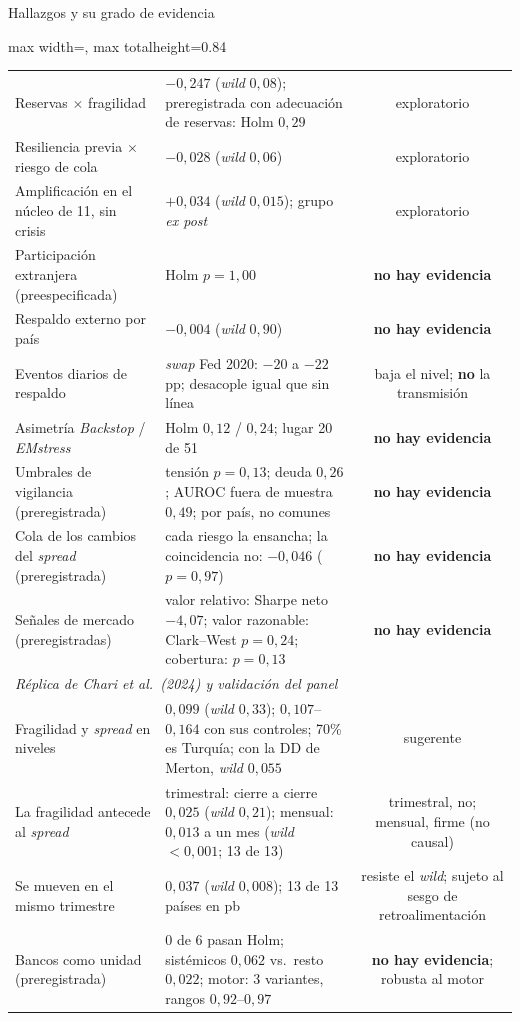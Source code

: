 \documentclass[aspectratio=169]{beamer}
\begin{document}
\begin{frame}{Hallazgos y su grado de evidencia}
\begin{adjustbox}{max width=\textwidth, max totalheight=0.84\textheight}
\begin{tabular}{llc}
Reservas $\times$ fragilidad & $-0{,}247$ (\textit{wild} $0{,}08$); preregistrada con adecuación de reservas: Holm $0{,}29$ & exploratorio \\
Resiliencia previa $\times$ riesgo de cola & $-0{,}028$ (\textit{wild} $0{,}06$) & exploratorio \\
Amplificación en el núcleo de 11, sin crisis & $+0{,}034$ (\textit{wild} $0{,}015$); grupo \textit{ex post} & exploratorio \\
Participación extranjera (preespecificada) & Holm $p=1{,}00$ & \textbf{no hay evidencia} \\
Respaldo externo por país & $-0{,}004$ (\textit{wild} $0{,}90$) & \textbf{no hay evidencia} \\
Eventos diarios de respaldo & \textit{swap} Fed 2020: $-20$ a $-22$ pp; desacople igual que sin línea & baja el nivel; \textbf{no} la transmisión \\
Asimetría \textit{Backstop} / \textit{EMstress} & Holm $0{,}12$ / $0{,}24$; lugar 20 de 51 & \textbf{no hay evidencia} \\
Umbrales de vigilancia (preregistrada) & tensión $p=0{,}13$; deuda $0{,}26$; AUROC fuera de muestra $0{,}49$; por país, no comunes & \textbf{no hay evidencia} \\
Cola de los cambios del \textit{spread} (preregistrada) & cada riesgo la ensancha; la coincidencia no: $-0{,}046$ ($p=0{,}97$) & \textbf{no hay evidencia} \\
Señales de mercado (preregistradas) & valor relativo: Sharpe neto $-4{,}07$; valor razonable: Clark--West $p=0{,}24$; cobertura: $p=0{,}13$ & \textbf{no hay evidencia} \\
\midrule
\multicolumn{3}{l}{\textit{Réplica de Chari et al.\ (2024) y validación del panel}} \\
Fragilidad y \textit{spread} en niveles & $0{,}099$ (\textit{wild} $0{,}33$); $0{,}107$--$0{,}164$ con sus controles; 70\% es Turquía; con la DD de Merton, \textit{wild} $0{,}055$ & sugerente \\
La fragilidad antecede al \textit{spread} & trimestral: cierre a cierre $0{,}025$ (\textit{wild} $0{,}21$); mensual: $0{,}013$ a un mes (\textit{wild} $<0{,}001$; 13 de 13) & trimestral, no; mensual, firme (no causal) \\
Se mueven en el mismo trimestre & $0{,}037$ (\textit{wild} $0{,}008$); 13 de 13 países en pb & resiste el \textit{wild}; sujeto al sesgo de retroalimentación \\
Bancos como unidad (preregistrada) & 0 de 6 pasan Holm; sistémicos $0{,}062$ vs.\ resto $0{,}022$; motor: 3 variantes, rangos $0{,}92$--$0{,}97$ & \textbf{no hay evidencia}; robusta al motor \\
\bottomrule
\end{tabular}
\end{adjustbox}
\end{frame}
\end{document}
